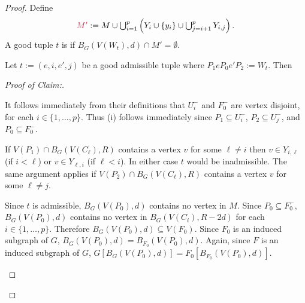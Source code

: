 \documentclass{patmorin}
\newcommand{\pat}[1]{\textcolor{Blue}{Pat: #1}}
\newenvironment{clmproof}{\begin{proof}[Proof of Claim:]\renewcommand{\qedsymbol}{\rule{1ex}{1ex}}}{\end{proof}}
\begin{document}
\begin{proof}
Define
\[
  \textstyle \mathdefin{M'}:= M \cup \bigcup_{i=1}^p \left(Y_i\cup\{y_i\} \cup \bigcup_{j=i+1}^{p} Y_{i,j}\right).
\]
A good tuple $t$ is  if $B_G(V(W_t),d) \cap M' = \emptyset$.


\begin{clm}\label{grow_in_forests}
  Let $t:=(e,i,e',j)$ be a good admissible tuple where $P_1eP_0e'P_2:=W_t$.  Then
\end{clm}

\begin{clmproof}\
  \begin{compactenum}[(i)]
    \item It follows immediately from their definitions that $U_i^-$ and $F_0^-$ are vertex disjoint, for each $i\in\{1,\ldots,p\}$. Thus (i) follows immediately since $P_1\subseteq U^-_i$, $P_2\subseteq U^-_j$, and $P_0\subseteq F_0^-$.

    \item If $V(P_1)\cap B_G(V(C_\ell),R)$ contains a vertex $v$ for some $\ell\neq i$ then $v\in Y_{i,\ell}$ (if $i<\ell$) or $v\in Y_{\ell,i}$ (if $\ell < i$).  In either case $t$ would be inadmissible.  The same argument applies if $V(P_2)\cap B_G(V(C_\ell),R)$ contains a vertex $v$ for some $\ell\neq j$.

    \item Since $t$ is admissible, $B_G(V(P_0),d)$ contains no vertex in $M$.  Since $P_0\subseteq F^-_0$, $B_G(V(P_0),d)$ contains no vertex in $B_G(V(C_i),R-2d)$ for each $i\in\{1,\ldots,p\}$.  Therefore $B_G(V(P_0),d)\subseteq V(F_0)$.  Since $F_0$ is an induced subgraph of $G$,  $B_G(V(P_0),d)=B_{F_0}(V(P_0),d)$.  Again, since $F$ is an induced subgraph of $G$, $G[B_G(V(P_0),d)]=F_0[B_{F_0}(V(P_0),d)]$.


\end{compactenum}
\end{clmproof}
\end{proof}
\end{document}
